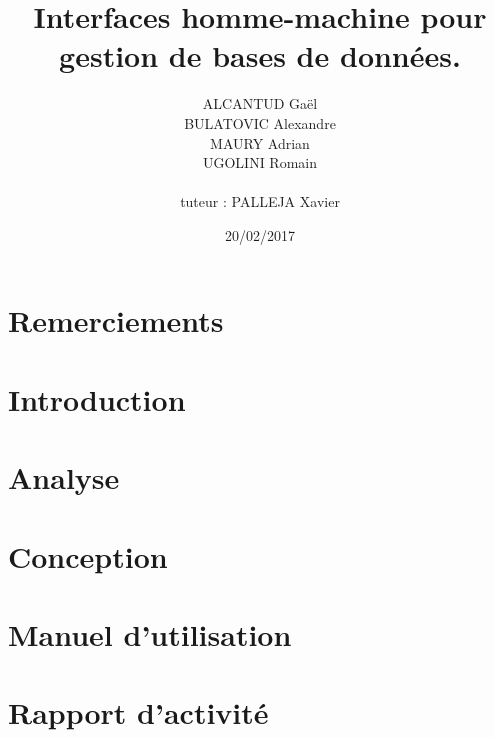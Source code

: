 \documentclass[12pt, a4paper, twoside, openright]{book}
\title{Interfaces homme-machine pour gestion de bases de données.}
\author{ALCANTUD Gaël \\ BULATOVIC Alexandre \\ MAURY Adrian \\ UGOLINI Romain \\ \\tuteur : PALLEJA Xavier}
\date{20/02/2017}
\begin{document}
\frontmatter
\maketitle

%

\thispagestyle{empty}
\chapter*{Remerciements}


\tableofcontents
\listoffigures
\printglossaries

\mainmatter
\chapter{Introduction}


\chapter{Analyse}


\chapter{Conception}


\chapter{Manuel d'utilisation}


\chapter{Rapport d'activité}


\backmatter
\end{document}
